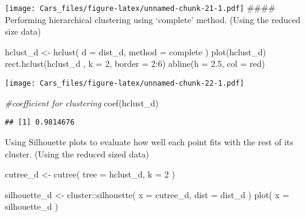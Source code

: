 \documentclass[
]{article}
\newenvironment{Shaded}{\begin{snugshade}}{\end{snugshade}}
\newcommand{\AttributeTok}[1]{\textcolor[rgb]{0.77,0.63,0.00}{#1}}
\newcommand{\CommentTok}[1]{\textcolor[rgb]{0.56,0.35,0.01}{\textit{#1}}}
\newcommand{\DecValTok}[1]{\textcolor[rgb]{0.00,0.00,0.81}{#1}}
\newcommand{\FloatTok}[1]{\textcolor[rgb]{0.00,0.00,0.81}{#1}}
\newcommand{\FunctionTok}[1]{\textcolor[rgb]{0.00,0.00,0.00}{#1}}
\newcommand{\NormalTok}[1]{#1}
\newcommand{\OtherTok}[1]{\textcolor[rgb]{0.56,0.35,0.01}{#1}}
\newcommand{\SpecialCharTok}[1]{\textcolor[rgb]{0.00,0.00,0.00}{#1}}
\newcommand{\StringTok}[1]{\textcolor[rgb]{0.31,0.60,0.02}{#1}}
\begin{document}
\texttt{[image: Cars\_files/figure-latex/unnamed-chunk-21-1.pdf]}
\#\#\#\# Performing hierarchical clustering using `complete' method.
(Using the reduced size data)

\begin{Shaded}
\begin{Highlighting}[]
\NormalTok{hclust\_d }\OtherTok{\textless{}{-}} \FunctionTok{hclust}\NormalTok{(}
  \AttributeTok{d =}\NormalTok{ dist\_d,}
  \AttributeTok{method =} \StringTok{\textquotesingle{}complete\textquotesingle{}}
\NormalTok{)}
\FunctionTok{plot}\NormalTok{(hclust\_d)}
\FunctionTok{rect.hclust}\NormalTok{(hclust\_d , }\AttributeTok{k =} \DecValTok{2}\NormalTok{, }\AttributeTok{border =} \DecValTok{2}\SpecialCharTok{:}\DecValTok{6}\NormalTok{)}
\FunctionTok{abline}\NormalTok{(}\AttributeTok{h =} \FloatTok{2.5}\NormalTok{, }\AttributeTok{col =} \StringTok{\textquotesingle{}red\textquotesingle{}}\NormalTok{)}
\end{Highlighting}
\end{Shaded}

\texttt{[image: Cars\_files/figure-latex/unnamed-chunk-22-1.pdf]}

\begin{Shaded}
\begin{Highlighting}[]
\CommentTok{\#coefficient for clustering}
\FunctionTok{coef}\NormalTok{(hclust\_d)}
\end{Highlighting}
\end{Shaded}

\begin{verbatim}
## [1] 0.9814676
\end{verbatim}

Using Silhouette plots to evaluate how well each point fits with the
rest of its cluster. (Using the reduced sized data)

\begin{Shaded}
\begin{Highlighting}[]
\NormalTok{cutree\_d }\OtherTok{\textless{}{-}} \FunctionTok{cutree}\NormalTok{(}
  \AttributeTok{tree =}\NormalTok{ hclust\_d,}
  \AttributeTok{k =} \DecValTok{2}
\NormalTok{)}

\NormalTok{silhouette\_d }\OtherTok{\textless{}{-}}\NormalTok{ cluster}\SpecialCharTok{::}\FunctionTok{silhouette}\NormalTok{(}
  \AttributeTok{x =}\NormalTok{ cutree\_d,}
  \AttributeTok{dist =}\NormalTok{ dist\_d}
\NormalTok{)}
\FunctionTok{plot}\NormalTok{(}
  \AttributeTok{x =}\NormalTok{ silhouette\_d}
\NormalTok{)}
\end{Highlighting}
\end{Shaded}
\end{document}
